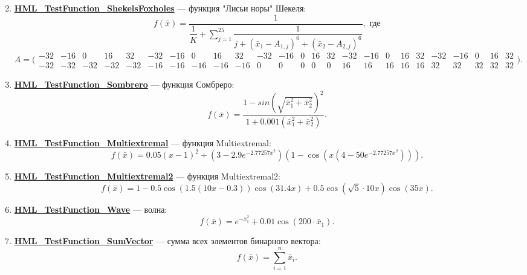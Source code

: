 \begin{enumerate}
\begin{equation}
 \end{equation}
 \item \hyperref[TestFunctions:section:HML_TestFunction_ShekelsFoxholes]{\textbf{HML\_TestFunction\_ShekelsFoxholes}} --- функция "Лисьи норы" Шекеля:
 \begin{equation}
 f\left( \bar{x}\right) = \dfrac{1}{\dfrac{1}{K}+\sum_{j=1}^{25}\dfrac{1}{j+\left( \bar{x}_1-A_{1,j}\right)^6+ \left( \bar{x}_2-A_{2,j}\right)^6}}, \text{ где}
 \end{equation}
 \begin{equation*}
 A =  \bigl(\begin{smallmatrix}
 -32 & -16 & 0 & 16 & 32 & -32 & -16 & 0 & 16 & 32 & -32 & -16 & 0 & 16 & 32 & -32 & -16 & 0 & 16 & 32 & -32 & -16 & 0 & 16 & 32\\
 -32 & -32 & -32 & -32 & -32 & -16 & -16 & -16 & -16 & -16 & 0 & 0 & 0 & 0 & 0 & 16 & 16 & 16 & 16 & 16 & 32 & 32 & 32 & 32 & 32
 \end{smallmatrix}\bigr).
 \end{equation*}
 \item \hyperref[TestFunctions:section:HML_TestFunction_Sombrero]{\textbf{HML\_TestFunction\_Sombrero}} --- функция Сомбреро:
 \begin{equation}
 f\left( \bar{x}\right) =\dfrac{1-{sin\left( \sqrt{\bar{x}_1^2+\bar{x}_2^2}\right)}^2 }{1+0.001\left(\bar{x}_1^2+\bar{x}_2^2 \right) }.
 \end{equation}
 \item \hyperref[TestFunctions:section:HML_TestFunction_Multiextremal]{\textbf{HML\_TestFunction\_Multiextremal}} --- функция Multiextremal:
 \begin{equation}
 f\left( \bar{x}\right) = 0.05\left( x-1\right)^2 + \left( 3-2.9e^{-2.77257x^2}\right)\left( 1-\cos\left(x\left(4-50e^{-2.77257x^2} \right)  \right) \right).
 \end{equation}
 \item \hyperref[TestFunctions:section:HML_TestFunction_Multiextremal2]{\textbf{HML\_TestFunction\_Multiextremal2}} --- функция Multiextremal2:
 \begin{equation}
 f\left( \bar{x}\right) =1-0.5\cos\left( 1.5\left( 10x-0.3\right) \right)\cos\left( 31.4x\right)+0.5\cos\left(\sqrt{5}\cdot10x \right)\cos\left( 35x\right). 
 \end{equation}
 \item \hyperref[TestFunctions:section:HML_TestFunction_Wave]{\textbf{HML\_TestFunction\_Wave}} --- волна:
 \begin{equation}
 f\left( \bar{x}\right) = e^{ -\bar{x}_1^2}+0.01\cos\left( 200\cdot\bar{x}_1\right).
 \end{equation}
 \item \hyperref[TestFunctions:section:HML_TestFunction_SumVector]{\textbf{HML\_TestFunction\_SumVector}} --- сумма всех элементов бинарного вектора:
 \begin{equation}
 f\left( \bar{x}\right) = \sum_{i=1}^{n}\bar{x}_i.
 \end{equation}
 \end{enumerate}